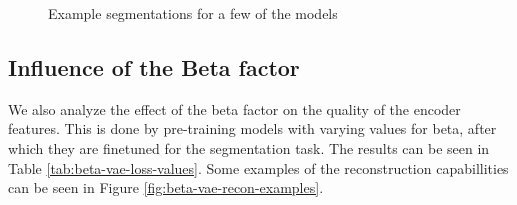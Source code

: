 \begin{figure}[!ht]
    \centering
    \caption{Example segmentations for a few of the models}
    \label{fig:vae-backbones}
     \quad
\end{figure}


\subsection{Influence of the Beta factor}
We also analyze the effect of the beta factor on the quality of the encoder features. This is done by pre-training models with varying values for beta, after which they are finetuned for the segmentation task. The results can be seen in Table \ref{tab:beta-vae-loss-values}. Some examples of the reconstruction capabillities can be seen in Figure \ref{fig:beta-vae-recon-examples}.

